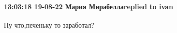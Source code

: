  
 
 
 
 

\paragraph{13:03:18 19-08-22 Мария Мирабеллаreplied to ivan}

Ну что,печеньку то заработал?
